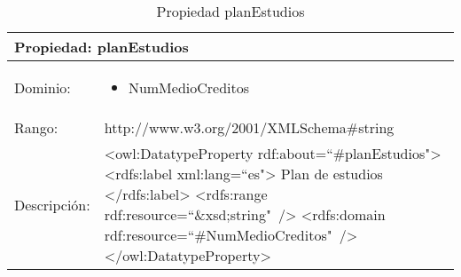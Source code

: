 \begin{table}[!ht]
	\centering
	\begin{tabular}{|p{}|p{}|}
		\hline
		\multicolumn{2}{|l|}{Propiedad: \textbf{planEstudios}}
		\\ \hline
		Dominio:&
		\begin{itemize}
			\item NumMedioCreditos
		\end{itemize}
		\\ \hline
		Rango:&
		http://www.w3.org/2001/XMLSchema\#string
		\\ \hline
		Descripción:&
		\textless owl:DatatypeProperty rdf:about=``\#planEstudios"\textgreater\newline 
		\tab\textless rdfs:label xml:lang=``es"\textgreater\newline
		\tab\tab Plan de estudios\newline
		\tab\textless /rdfs:label\textgreater\newline
		\tab\textless rdfs:range\newline
		\tab\tab rdf:resource=``\&xsd;string"\ /\textgreater\newline
		\tab\textless rdfs:domain\newline
		\tab\tab rdf:resource=``\#NumMedioCreditos"\ /\textgreater\newline
		\textless /owl:DatatypeProperty\textgreater
		\\ \hline
	\end{tabular}
	\caption{Propiedad planEstudios}
	\label{propiedad-planestudios}
\end{table}

